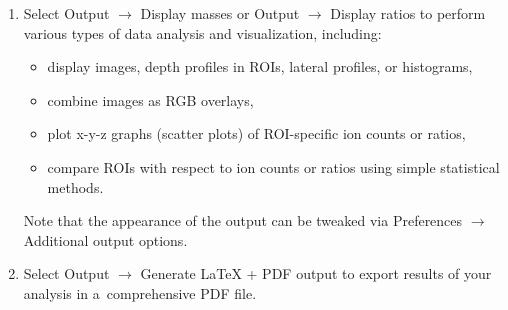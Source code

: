 \documentclass[a4paper, 11pt]{article}
\newcommand{\ttt}[1]{\texttt{#1}}
\newcommand{\lans}[1]{{\color{magenta}#1}}
\newcommand{\lanscb}[1]{{\color{darkgreen}#1}}
\newcommand\mnote{\marginnote{\fbox{\textbf{\bf Note}}}}
\newcommand\ra{\rightarrow}
\newcommand\addon[1]{-- {\small #1}}
\begin{document}
\begin{enumerate}
\item Select \lans{Output} $\ra$ \lans{Display masses} or \lans{Output} $\ra$ \lans{Display ratios} to perform various types of data analysis and visualization, including:

\begin{itemize}
\item display \lanscb{images}, \lanscb{depth profiles in ROIs}, \lanscb{lateral profiles}, or \lanscb{histograms},
\item \lanscb{combine images as RGB} overlays,
\item \lanscb{plot x-y-z graphs} (scatter plots) of ROI-specific ion counts or ratios,  
\item \lanscb{compare ROIs} with respect to ion counts or ratios using simple statistical methods.
\end{itemize}
%
Note that the appearance of the output can be tweaked via \lans{Preferences} $\ra$ \lans{Additional output options}.






\item Select \lans{Output} $\ra$ \lans{Generate LaTeX + PDF output} to export results of your analysis in a~comprehensive PDF file. 



\end{enumerate}
\end{document}
